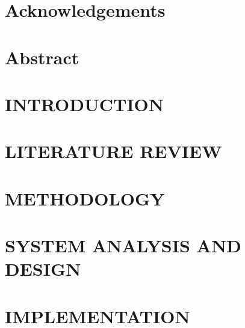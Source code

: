 \documentclass[12pt, twoside]{report}
\begin{document}
\restoregeometry

\chapter*{Acknowledgements}

\thispagestyle{empty}

\newpage
\tableofcontents
\newpage
\listoftables
{}
\newpage
\listoffigures
{}
\newpage

\chapter*{Abstract}


\ifprintlayout\cleardoublepage\fi
\chapter{INTRODUCTION}
\setcounter{page}{1}


\chapter{LITERATURE REVIEW}


\chapter{METHODOLOGY}


\chapter{SYSTEM ANALYSIS AND DESIGN}


\chapter{IMPLEMENTATION}

\end{document}
